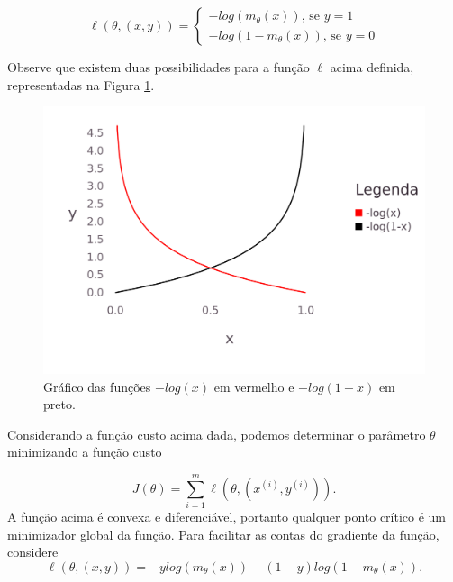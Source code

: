 \documentclass[
	12pt,				%
    oneside,			%
	a4paper,			%
	english,			%
	french,				%
	spanish,			%
	brazil,				%
	]{abntex2}
\begin{document}
            \begin{equation}
                \label{eq:custclass}
                \ell(\theta,(x,y)) = \left \{
                    \begin{aligned}
                        -log(m_\theta(x)) \mbox{, se }y=1 \\
                        -log(1-m_\theta(x))\mbox{, se }y=0
                    \end{aligned}
                \right.
            \end{equation}

            Observe que existem duas possibilidades para a função $\ell$ acima definida, representadas na Figura \ref{fig:custofig}.
            \begin{figure}[ht]
                \centering
                \includegraphics[width=.7\textwidth]{costfunction.png}
                \caption{Gráfico das funções $-log(x)$ em vermelho e $-log(1-x)$ em preto.}
                \label{fig:custofig}
            \end{figure}
            Considerando a função custo acima dada, podemos determinar o parâmetro $\theta$ minimizando a função custo

            \begin{equation}
                \label{eq:custtot}
                J(\theta) = \sum_{i=1}^{m} \ell(\theta, (x^{(i)}, y^{(i)})).
            \end{equation}
            A função acima é convexa e diferenciável, portanto qualquer ponto crítico é um minimizador global da função. Para facilitar as contas do gradiente da função, considere
            \begin{equation}
                \label{eq:custtroc}
                \ell(\theta, (x, y)) = -ylog(m_\theta(x)) - (1-y)log(1-m_\theta(x)).
            \end{equation}
\end{document}
